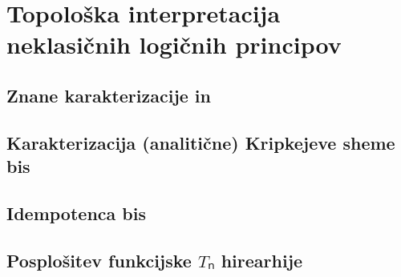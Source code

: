 \section{Topološka interpretacija neklasičnih logičnih principov}

\subsection{Znane karakterizacije \lem* in \lpo*}
\subsection{Karakterizacija (analitične) Kripkejeve sheme bis}
\subsection{Idempotenca \lpo* bis}
\subsection{Posplošitev funkcijske \(Tₙ\) hirearhije}

